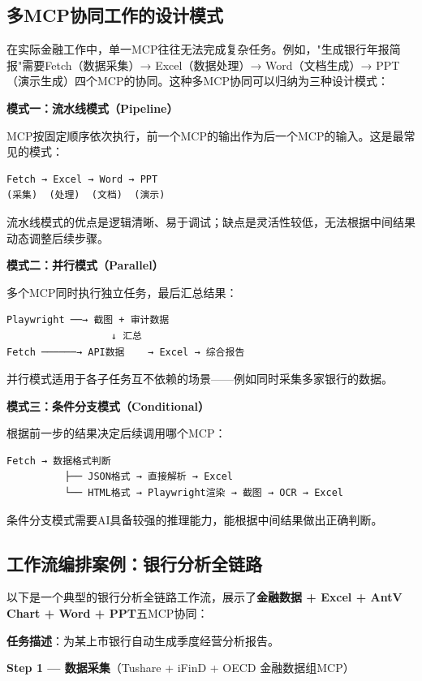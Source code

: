 \subsection{多MCP协同工作的设计模式}

在实际金融工作中，单一MCP往往无法完成复杂任务。例如，"生成银行年报简报"需要Fetch（数据采集）→ Excel（数据处理）→ Word（文档生成）→ PPT（演示生成）四个MCP的协同。这种多MCP协同可以归纳为三种设计模式：

\textbf{模式一：流水线模式（Pipeline）}

MCP按固定顺序依次执行，前一个MCP的输出作为后一个MCP的输入。这是最常见的模式：

\begin{verbatim}
Fetch → Excel → Word → PPT
(采集)  (处理)  (文档)  (演示)
\end{verbatim}

流水线模式的优点是逻辑清晰、易于调试；缺点是灵活性较低，无法根据中间结果动态调整后续步骤。

\textbf{模式二：并行模式（Parallel）}

多个MCP同时执行独立任务，最后汇总结果：

\begin{verbatim}
Playwright ──→ 截图 + 审计数据
                  ↓ 汇总
Fetch ──────→ API数据    → Excel → 综合报告
\end{verbatim}

并行模式适用于各子任务互不依赖的场景——例如同时采集多家银行的数据。

\textbf{模式三：条件分支模式（Conditional）}

根据前一步的结果决定后续调用哪个MCP：

\begin{verbatim}
Fetch → 数据格式判断
          ├── JSON格式 → 直接解析 → Excel
          └── HTML格式 → Playwright渲染 → 截图 → OCR → Excel
\end{verbatim}

条件分支模式需要AI具备较强的推理能力，能根据中间结果做出正确判断。

\subsection{工作流编排案例：银行分析全链路}

以下是一个典型的银行分析全链路工作流，展示了\textbf{金融数据 + Excel + AntV Chart + Word + PPT}五MCP协同：

\textbf{任务描述}：为某上市银行自动生成季度经营分析报告。

\textbf{Step 1 — 数据采集}（Tushare + iFinD + OECD 金融数据组MCP）

